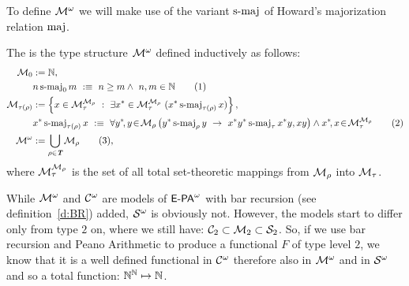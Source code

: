 To define $\mathcal{M} ^\omega$ we will make use of the variant $\operatorname{s-maj}$ of Howard's majorization relation $\operatorname{maj}$.
\begin{dfn}{\bf\cite{Bezem85}} The  is the
type structure $\mathcal{M} ^\omega$ defined inductively as follows:
\begin{align*}
%
\MajO_0&:=\NN,\\
&n \smaj_0 m\ :\equiv\ n\geq m\wedge\ n,m\in\NN \tag{1}\\
%
\MajO_{\tau(\rho)}&:=\left\{x\in\MajO^{\MajO_\rho}_{\tau}\ :\ 
                                 \exists x^*\in\MajO^{\MajO_\rho}_{\tau}\ (x^* \smaj_{\tau(\rho)} x)\right\},\\
&x^* \smaj_{\tau(\rho)} x\ :\equiv\ 
             \forall y^*\!,y\!\in\!\MajO_\rho\left( y^*\smaj_\rho y\ \rightarrow\ x^*y^*\smaj_\tau x^*y, xy \right)
             \wedge x^*\!,x\!\in\!\MajO^{\MajO_\rho}_{\tau} \tag{2}\\
%
\Maj&:=\bigcup_{\rho\in\Tp}\MajO_\rho  \tag{3}
%
\text{,}
\end{align*}
%
where $\mathcal{M} ^{\mathcal{M} _\rho}_{\tau}$ is the set of all total set-theoretic mappings 
from $\mathcal{M} _\rho$ into $\mathcal{M} _\tau$.
\end{dfn}
\begin{rmk} While $\mathcal{M} ^\omega$ and $\mathcal{C} ^\omega$ are models of ${\textsf{\upshape E-PA}}^\omega$ with bar recursion (see definition~\ref{d:BR})
added, $\mathcal{S} ^\omega$ is obviously not. However, the models start to differ only from type $2$ on, where
we still have: $\mathcal{C} _2\subset\mathcal{M} _2\subset\mathcal{S} _2$. So, if we use bar recursion and Peano Arithmetic to
produce a functional $F$ of type level $2$, we know that it is a well defined functional in $\mathcal{C} ^\omega$ therefore
also in $\mathcal{M} ^\omega$ and in $\mathcal{S} ^\omega$ and so a total function: $\mathbb{N}^{\mathbb{N}}\mapsto\mathbb{N}$.
\end{rmk}

